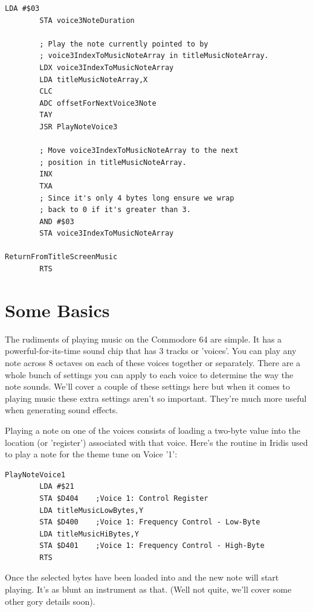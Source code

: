 \begin{lstlisting}[caption=Routine responsible for playing the title tune.]
        LDA #$03
        STA voice3NoteDuration

        ; Play the note currently pointed to by 
        ; voice3IndexToMusicNoteArray in titleMusicNoteArray.
        LDX voice3IndexToMusicNoteArray
        LDA titleMusicNoteArray,X
        CLC
        ADC offsetForNextVoice3Note
        TAY
        JSR PlayNoteVoice3

        ; Move voice3IndexToMusicNoteArray to the next
        ; position in titleMusicNoteArray.
        INX
        TXA
        ; Since it's only 4 bytes long ensure we wrap
        ; back to 0 if it's greater than 3.
        AND #$03
        STA voice3IndexToMusicNoteArray

ReturnFromTitleScreenMusic   
        RTS
\end{lstlisting}

\section{Some Basics}
The rudiments of playing music on the Commodore 64 are simple. It has a powerful-for-its-time
sound chip that has 3 tracks or 'voices'. You can play any note across 8 octaves on each of
these voices together or separately. There are a whole bunch of settings you can apply
to each voice to determine the way the note sounds. We'll cover a couple of these settings
here but when it comes to playing music these extra settings aren't so important. They're
much more useful when generating sound effects.

Playing a note on one of the voices consists of loading a two-byte value into the location
(or 'register') associated with that voice. Here's the routine in Iridis used to play a note
for the theme tune on Voice '1':

\begin{lstlisting}[caption=Plays a note on Voice 1. The routine is supplied with a value in Y
that indexes into two arrays\ containing the first (Hi) and second (Lo) byte respectively\ associated with the selected note.]
PlayNoteVoice1
        LDA #$21
        STA $D404    ;Voice 1: Control Register
        LDA titleMusicLowBytes,Y
        STA $D400    ;Voice 1: Frequency Control - Low-Byte
        LDA titleMusicHiBytes,Y
        STA $D401    ;Voice 1: Frequency Control - High-Byte
        RTS
\end{lstlisting}

Once the selected bytes have been loaded into  and  the new note will start playing. 
It's as blunt an instrument as that. (Well not quite, we'll cover some other gory details soon). 

